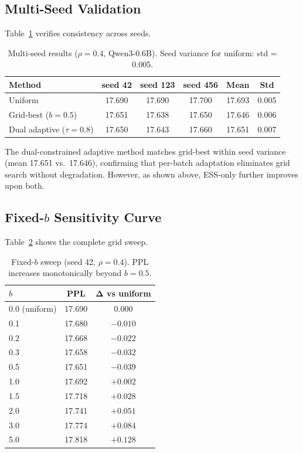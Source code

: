 \documentclass[11pt]{article}
\begin{document}
\subsection{Multi-Seed Validation}

Table~\ref{tab:seeds} verifies consistency across seeds.

\begin{table}[h]
\centering
\caption{Multi-seed results ($\rho = 0.4$, Qwen3-0.6B). Seed variance for uniform: std = 0.005.}
\label{tab:seeds}
\begin{tabular}{lccccc}
\toprule
\textbf{Method} & \textbf{seed 42} & \textbf{seed 123} & \textbf{seed 456} & \textbf{Mean} & \textbf{Std} \\
\midrule
Uniform & 17.690 & 17.690 & 17.700 & 17.693 & 0.005 \\
Grid-best ($b = 0.5$) & 17.651 & 17.638 & 17.650 & 17.646 & 0.006 \\
Dual adaptive ($\tau = 0.8$) & 17.650 & 17.643 & 17.660 & 17.651 & 0.007 \\
\bottomrule
\end{tabular}
\end{table}

The dual-constrained adaptive method matches grid-best within seed variance (mean 17.651 vs.\ 17.646), confirming that per-batch adaptation eliminates grid search without degradation. However, as shown above, ESS-only further improves upon both.

\subsection{Fixed-$b$ Sensitivity Curve}

Table~\ref{tab:grid} shows the complete grid sweep.

\begin{table}[h]
\centering
\caption{Fixed-$b$ sweep (seed 42, $\rho = 0.4$). PPL increases monotonically beyond $b = 0.5$.}
\label{tab:grid}
\begin{tabular}{lcc}
\toprule
$b$ & \textbf{PPL} & $\boldsymbol{\Delta}$ \textbf{vs uniform} \\
\midrule
0.0 (uniform) & 17.690 & 0.000 \\
0.1 & 17.680 & $-0.010$ \\
0.2 & 17.668 & $-0.022$ \\
0.3 & 17.658 & $-0.032$ \\
0.5 & 17.651 & $-0.039$ \\
1.0 & 17.692 & $+0.002$ \\
1.5 & 17.718 & $+0.028$ \\
2.0 & 17.741 & $+0.051$ \\
3.0 & 17.774 & $+0.084$ \\
5.0 & 17.818 & $+0.128$ \\
\bottomrule
\end{tabular}
\end{table}
\end{document}
